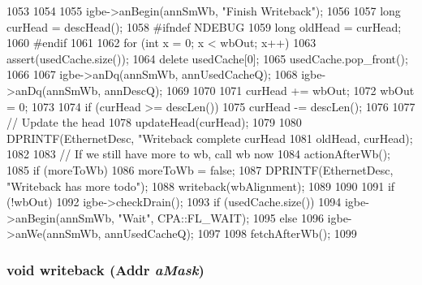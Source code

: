 \begin{DoxyCode}
1053 {
1054 
1055     igbe->anBegin(annSmWb, "Finish Writeback");
1056 
1057     long  curHead = descHead();
1058 #ifndef NDEBUG
1059     long oldHead = curHead;
1060 #endif
1061             
1062     for (int x = 0; x < wbOut; x++) {
1063         assert(usedCache.size());
1064         delete usedCache[0];
1065         usedCache.pop_front();
1066 
1067         igbe->anDq(annSmWb, annUsedCacheQ);
1068         igbe->anDq(annSmWb, annDescQ);
1069     }
1070 
1071     curHead += wbOut;
1072     wbOut = 0;
1073 
1074     if (curHead >= descLen())
1075         curHead -= descLen();
1076 
1077     // Update the head
1078     updateHead(curHead);
1079 
1080     DPRINTF(EthernetDesc, "Writeback complete curHead %
1081             oldHead, curHead);
1082 
1083     // If we still have more to wb, call wb now
1084     actionAfterWb();
1085     if (moreToWb) {
1086         moreToWb = false;
1087         DPRINTF(EthernetDesc, "Writeback has more todo\n");
1088         writeback(wbAlignment);
1089     }
1090 
1091     if (!wbOut) {
1092         igbe->checkDrain();
1093         if (usedCache.size())
1094             igbe->anBegin(annSmWb, "Wait", CPA::FL_WAIT);
1095         else
1096             igbe->anWe(annSmWb, annUsedCacheQ);
1097     }
1098     fetchAfterWb();
1099 }
\end{DoxyCode}
\hypertarget{classIGbE_1_1DescCache_af6593b85cc3920a68b9a0317053a4416}{
\subsubsection[{writeback}]{\setlength{\rightskip}{0pt plus 5cm}void writeback ({\bf Addr} {\em aMask})}}
\label{classIGbE_1_1DescCache_af6593b85cc3920a68b9a0317053a4416}



